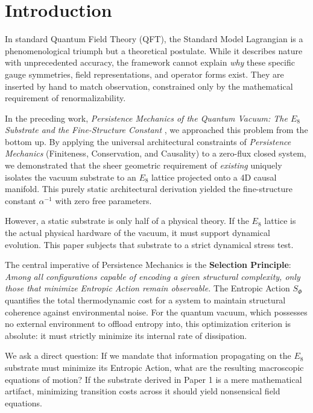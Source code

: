 \section{Introduction}

In standard Quantum Field Theory (QFT), the Standard Model Lagrangian is a phenomenological triumph but a theoretical postulate. While it describes nature with unprecedented accuracy, the framework cannot explain \textit{why} these specific gauge symmetries, field representations, and operator forms exist. They are inserted by hand to match observation, constrained only by the mathematical requirement of renormalizability.

In the preceding work, \textit{Persistence Mechanics of the Quantum Vacuum: The $E_8$ Substrate and the Fine-Structure Constant} \cite{kate_meyer_informational_2026}, we approached this problem from the bottom up. By applying the universal architectural constraints of \textit{Persistence Mechanics}\cite{kate_meyer_persistence_2026} (Finiteness, Conservation, and Causality) to a zero-flux closed system, we demonstrated that the sheer geometric requirement of \textit{existing} uniquely isolates the vacuum substrate to an $E_8$ lattice projected onto a 4D causal manifold. This purely static architectural derivation yielded the fine-structure constant $\alpha^{-1}$ with zero free parameters.

However, a static substrate is only half of a physical theory. If the $E_8$ lattice is the actual physical hardware of the vacuum, it must support dynamical evolution. This paper subjects that substrate to a strict dynamical stress test. 

The central imperative of Persistence Mechanics is the \textbf{Selection Principle}: \textit{Among all configurations capable of encoding a given structural complexity, only those that minimize Entropic Action remain observable.} The Entropic Action $S_\Phi$ quantifies the total thermodynamic cost for a system to maintain structural coherence against environmental noise. For the quantum vacuum, which possesses no external environment to offload entropy into, this optimization criterion is absolute: it must strictly minimize its internal rate of dissipation. 

We ask a direct question: If we mandate that information propagating on the $E_8$ substrate must minimize its Entropic Action, what are the resulting macroscopic equations of motion? If the substrate derived in Paper 1 is a mere mathematical artifact, minimizing transition costs across it should yield nonsensical field equations. 

